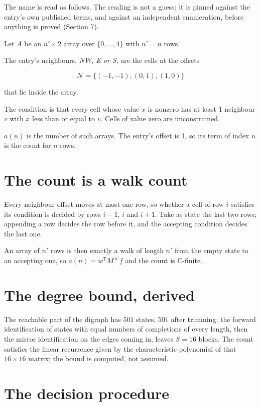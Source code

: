 \documentclass[11pt]{article}
\theoremstyle{definition}
\begin{document}
The name is read as follows. The reading is not a guess: it is pinned against the entry's own published terms, and against an independent enumeration, before anything is proved (Section 7).

Let $A$ be an $n' \times 2$ array over $\{0,\dots,4\}$ with $n' = n$ rows.

The entry's neighbours, {\itshape NW, E or S}, are the cells at the offsets

\[\mathcal{N} = \{(-1,-1), (0,1), (1,0)\}\]

that lie inside the array.

The condition is that every cell whose value $x$ is nonzero has at least 1 neighbour $v$ with $x$ less than or equal to $v$. Cells of value zero are unconstrained.

$a(n)$ is the number of such arrays. The entry's offset is 1, so its term of index $n$ is the count for $n$ rows.

\section{The count is a walk count}

Every neighbour offset moves at most one row, so whether a cell of row $i$ satisfies its condition is decided by rows $i-1$, $i$ and $i+1$. Take as state the last two rows; appending a row decides the row before it, and the accepting condition decides the last one.

An array of $n'$ rows is then exactly a walk of length $n'$ from the empty state to an accepting one, so $a(n) = w^{\mathsf T}M^{\,n'}f$ and the count is C-finite.

\section{The degree bound, derived}

The reachable part of the digraph has $501$ states, $501$ after trimming; the forward identification of states with equal numbers of completions of every length, then the mirror identification on the edges coming in, leaves $S = 16$ blocks. The count satisfies the linear recurrence given by the characteristic polynomial of that $16\times16$ matrix; the bound is computed, not assumed.

\section{The decision procedure}
\end{document}

